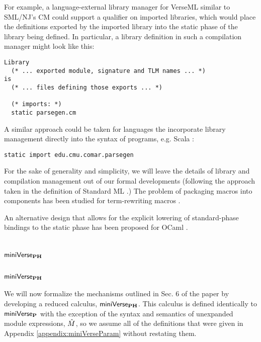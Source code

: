 {For example, a language-external library manager for VerseML similar to SML/NJ's CM \cite{blume:smlnj-cm} could support a  qualifier on imported libraries, which would place the definitions exported by the imported library into the static phase of the library being defined. In particular, a library definition in such a compilation manager might look like this:
\begin{lstlisting}[numbers=none,morekeywords={Library,is}]
Library 
  (* ... exported module, signature and TLM names ... *)
is 
  (* ... files defining those exports ... *)

  (* imports: *)
  static parsegen.cm 
\end{lstlisting}

A similar approach could be taken for languages the incorporate library management directly into the syntax of programs, e.g. Scala \cite{odersky2008programming}:
\begin{lstlisting}[numbers=none]
static import edu.cmu.comar.parsegen
\end{lstlisting}

For the sake of generality and simplicity, we will leave the details of library and compilation management out of our formal developments (following the approach taken in the definition of Standard ML \cite{mthm97-for-dart}.) The problem of packaging macros into components has been studied for term-rewriting macros \cite{culpepper2005syntactic}.

An alternative design that allows for the explicit lowering of standard-phase bindings to the static phase has been proposed for OCaml \cite{Ocaml/macros}. 


\fi

\ificfp
\chapter{\texorpdfstring{$\mathsf{miniVerse}_\textbf{PH}$}{miniVersePH}}
\else
\section{\texorpdfstring{$\mathsf{miniVerse}_\textbf{PH}$}{miniVersePH}}
\fi
\ificfp

We will now formalize the mechanisms outlined in Sec. 6 of the paper by developing a reduced calculus, $\mathsf{miniVerse}_\textbf{PH}$. This calculus is defined identically to $\mathsf{miniVerse}_\textbf{P}$ with the exception of the syntax and semantics of unexpanded module expressions, ${\hat M}$, so we assume all of the definitions that were given in Appendix \ref{appendix:miniVerseParam} without restating them. 

}

